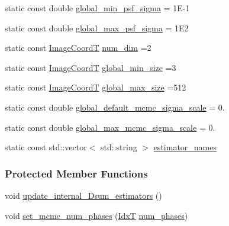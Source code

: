 \begin{DoxyCompactItemize}
\item 
static const double \hyperlink{classmappel_1_1PointEmitterModel_a77d0ca98d77cb8b94117ece2a5b182a4}{global\+\_\+min\+\_\+psf\+\_\+sigma} = 1\+E-\/1
\item 
static const double \hyperlink{classmappel_1_1PointEmitterModel_a5e79dba8966c25c4e9c675cd1a2cab70}{global\+\_\+max\+\_\+psf\+\_\+sigma} = 1\+E2
\item 
static const \hyperlink{classmappel_1_1ImageFormat2DBase_a45e9234d63c357f34ca56c72c12b9e9c}{Image\+CoordT} \hyperlink{classmappel_1_1ImageFormat2DBase_a9c29fcaf30faffc77b41ba556ebb0127}{num\+\_\+dim} =2
\item 
static const \hyperlink{classmappel_1_1ImageFormat2DBase_a45e9234d63c357f34ca56c72c12b9e9c}{Image\+CoordT} \hyperlink{classmappel_1_1ImageFormat2DBase_a1149e8545d3cfaa40c2f3bc02e3223b2}{global\+\_\+min\+\_\+size} =3
\item 
static const \hyperlink{classmappel_1_1ImageFormat2DBase_a45e9234d63c357f34ca56c72c12b9e9c}{Image\+CoordT} \hyperlink{classmappel_1_1ImageFormat2DBase_a11c9bb87930f597dff17e9923b73bf5e}{global\+\_\+max\+\_\+size} =512
\item 
static const double \hyperlink{classmappel_1_1MCMCAdaptorBase_a44cebca0e27135c854fa8430d2d89929}{global\+\_\+default\+\_\+mcmc\+\_\+sigma\+\_\+scale} = 0.
\item 
static const double \hyperlink{classmappel_1_1MCMCAdaptorBase_aebc93881ca351e67de867238a62579eb}{global\+\_\+max\+\_\+mcmc\+\_\+sigma\+\_\+scale} = 0.
\item 
static const std\+::vector$<$ std\+::string $>$ \hyperlink{classmappel_1_1PoissonNoise2DObjective_ac661699516dcee8b4e8a440e9b8b62d1}{estimator\+\_\+names}
\end{DoxyCompactItemize}
\subsubsection*{Protected Member Functions}
\begin{DoxyCompactItemize}
\item 
void \hyperlink{classmappel_1_1Gauss2DModel_a221f765c48f478177f150c08733e9d29}{update\+\_\+internal\+\_\+Dsum\+\_\+estimators} ()
\item 
void \hyperlink{classmappel_1_1MCMCAdaptorBase_ad6c75e327e8732abc2654492f372563a}{set\+\_\+mcmc\+\_\+num\+\_\+phases} (\hyperlink{namespacemappel_ab17ec0f30b61ece292439d7ece81d3a8}{IdxT} \hyperlink{classmappel_1_1MCMCAdaptorBase_a44b90a984ace712584074dc17831fe25}{num\+\_\+phases})
\end{DoxyCompactItemize}
